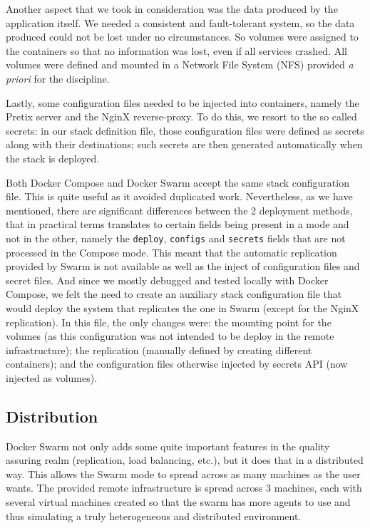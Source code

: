 \documentclass[12pt]{article}
\begin{document}
Another aspect that we took in consideration was the data produced by the application itself. 
We needed a consistent and fault-tolerant system, so the data produced could not be lost under no circumstances. 
So volumes were assigned to the containers so that no information was lost, even if all services crashed.
All volumes were defined and mounted in a Network File System (NFS) provided \textit{a priori} for the discipline.

Lastly, some configuration files needed to be injected into containers, namely the Pretix server and the NginX reverse-proxy. 
To do this, we resort to the so called secrets: in our stack definition file, those configuration files were defined as secrets along with their destinations; 
such secrets are then generated automatically when the stack is deployed. 

Both Docker Compose and Docker Swarm accept the same stack configuration file. 
This is quite useful as it avoided duplicated work.
Nevertheless, as we have mentioned, there are significant differences between the 2 deployment methods, that in practical terms translates to certain fields 
being present in a mode and not in the other, namely the \texttt{deploy}, \texttt{configs} and \texttt{secrets} fields that are not processed in the Compose mode.
This meant that the automatic replication provided by Swarm is not available as well as the inject of configuration files and secret files. 
And since we mostly debugged and tested locally with Docker Compose, we felt the need to create an auxiliary stack configuration file that would deploy the 
system that replicates the one in Swarm (except for the NginX replication). 
In this file, the only changes were: the mounting point for the volumes (as this configuration was not intended to be deploy in the remote infrastructure); the 
replication (manually defined by creating different containers); and the configuration files otherwise injected by secrets API (now injected as volumes).

\subsection{Distribution} \label{strategy.distribution} %


Docker Swarm not only adds some quite important features in the quality assuring realm (replication, load balancing, etc.), but it does that in a distributed way. 
This allows the Swarm mode to spread across as many machines as the user wants. 
The provided remote infrastructure is spread across 3 machines, each with several virtual machines created so that the swarm has more agents to use and thus 
simulating a truly heterogeneous and distributed environment.
\end{document}
